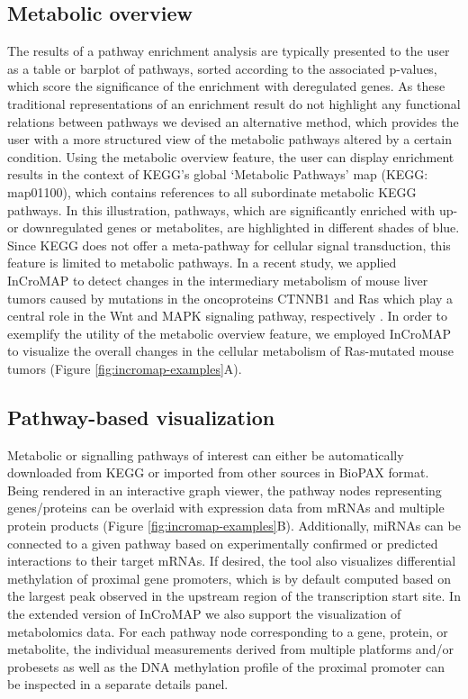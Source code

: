 \documentclass[final,5p,times,twocolumn]{elsarticle}
\newcommand\red[1]{{\color{red}#1}}
\begin{document}
\subsection{Metabolic overview}
The results of a pathway enrichment analysis are typically presented to the user as a table or barplot of pathways, sorted according to the associated p-values, which score the significance of the enrichment with deregulated genes. As these traditional representations of an enrichment result do not highlight any functional relations between pathways we devised an alternative method, which provides the user with a more structured view of the metabolic pathways altered by a certain condition. Using the metabolic overview feature, the user can display enrichment results in the context of KEGG's global `Metabolic Pathways' map (KEGG: map01100), which contains references to all subordinate metabolic KEGG pathways. In this illustration, pathways, which are significantly enriched with up- or downregulated genes or metabolites, are highlighted in different shades of blue. Since KEGG does not offer a meta-pathway for cellular signal transduction, this feature is limited to metabolic pathways. \red{In a recent study, we applied InCroMAP to detect changes in the intermediary metabolism of mouse liver tumors caused by mutations in the oncoproteins CTNNB1 and Ras which play a central role in the Wnt and MAPK signaling pathway, respectively \cite{Unterberger2014}. In order to exemplify the utility of the metabolic overview feature, we employed InCroMAP to visualize the overall changes in the cellular metabolism of Ras-mutated mouse tumors (Figure \ref{fig:incromap-examples}A)}.

\subsection{Pathway-based visualization}
Metabolic or signalling pathways of interest can either be automatically downloaded from KEGG or imported from other sources in BioPAX format. Being rendered in an interactive graph viewer, the pathway nodes representing genes/proteins can be overlaid with expression data from mRNAs and multiple protein products (Figure \ref{fig:incromap-examples}B). Additionally, miRNAs can be connected to a given pathway based on experimentally confirmed or predicted interactions to their target mRNAs. If desired, the tool also visualizes differential methylation of proximal gene promoters, which is by default computed based on the largest peak observed in the upstream region of the transcription start site. In the extended version of InCroMAP we also support the visualization of metabolomics data. For each pathway node corresponding to a gene, protein, or metabolite, the individual measurements derived from multiple platforms and/or probesets as well as the DNA methylation profile of the proximal promoter can be inspected in a separate details 
panel. 
\end{document}
